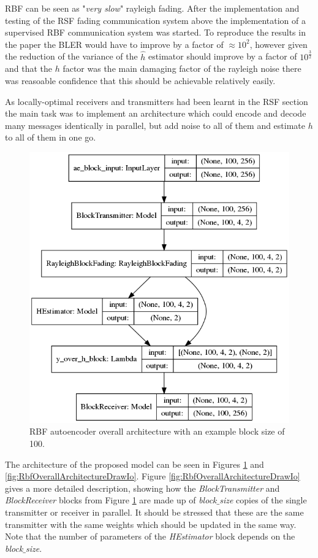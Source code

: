 \documentclass[12pt,onecolumn,letterpaper]{article}
\newcommand{\code}{\textit}
\newcommand\genfigsize{0.5}
\begin{document}
RBF can be seen as "\textit{very slow}" rayleigh fading. After the implementation and testing of the RSF fading communication system above the implementation of a supervised RBF communication system was started. To reproduce the results in the paper the BLER would have to improve by a factor of $\approx10^2$, however given the reduction of the variance of the $\hat{h}$ estimator should improve by a factor of $10^{\frac{3}{2}}$ and that the $h$ factor was the main damaging factor of the rayleigh noise there was reasoable confidence that this should be achievable relatively easily. 

As locally-optimal receivers and transmitters had been learnt in the RSF section the main task was to implement an architecture which could encode and decode many messages identically in parallel, but add noise to all of them and estimate $h$ to all of them in one go.

\begin{figure}
   \centering
   \includegraphics[width=\genfigsize\linewidth]{figures/aoudia_paper/autoencoder_rbf_10e2.png}
   \caption{RBF autoencoder overall architecture with an example block size of 100.}
   \label{fig:RbfOverallArchitecture}
\end{figure}

The architecture of the proposed model can be seen in Figures \ref{fig:RbfOverallArchitecture} and \ref{fig:RbfOverallArchitectureDrawIo}. Figure \ref{fig:RbfOverallArchitectureDrawIo} gives a more detailed description, showing how the \code{BlockTransmitter} and \code{BlockReceiver} blocks from Figure \ref{fig:RbfOverallArchitecture} are made up of \code{block$\_$size} copies of the single transmitter or receiver in parallel. It should be stressed that these are the same transmitter with the same weights which should be updated in the same way. Note that the number of parameters of the \code{HEstimator} block depends on the \code{block$\_$size}. 
\end{document}

